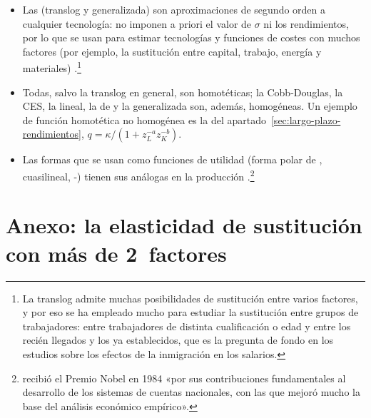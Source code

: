 \documentclass[11pt]{article}
\begin{document}
\begin{itemize}
\item Las  (translog y  generalizada) son aproximaciones de segundo orden a cualquier tecnología: no imponen a priori el valor de $\sigma$ ni los rendimientos, por lo que se usan para estimar tecnologías y funciones de costes con muchos factores (por ejemplo, la sustitución entre capital, trabajo, energía y materiales) .\footnote{La translog admite muchas posibilidades de sustitución entre varios factores, y por eso se ha empleado mucho para estudiar la sustitución entre grupos de trabajadores: entre trabajadores de distinta cualificación o edad y entre los recién llegados y los ya establecidos, que es la pregunta de fondo en los estudios sobre los efectos de la inmigración en los salarios.}
\item Todas, salvo la translog en general, son homotéticas; la Cobb-Douglas, la CES, la lineal, la de  y la  generalizada son, además, homogéneas. Un ejemplo de función homotética no homogénea es la del apartado~\ref{sec:largo-plazo-rendimientos}, $q=\kappa/(1+z_L^{-a}z_K^{-b})$.
\item Las formas que se usan como funciones de utilidad (forma polar de , cuasilineal, -) tienen sus análogas en la producción .\footnote{ recibió el Premio Nobel en 1984 «por sus contribuciones fundamentales al desarrollo de los sistemas de cuentas nacionales, con las que mejoró mucho la base del análisis económico empírico»\nocite{Nobel1984Stone}.}
\end{itemize}

\section{Anexo: la elasticidad de sustitución con más de 2~factores}\label{anexo:sigma-n}
\end{document}

